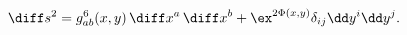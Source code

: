 \begin{equation}
   \diff s^2 = g^6_{ab}(x,y)\,\diff x^a \,\diff x^b 
       + \ex^{2\Phi(x,y)} \delta_{ij}\dd y^i \dd y^j .
\label{sixtwometric} 
\end{equation}

